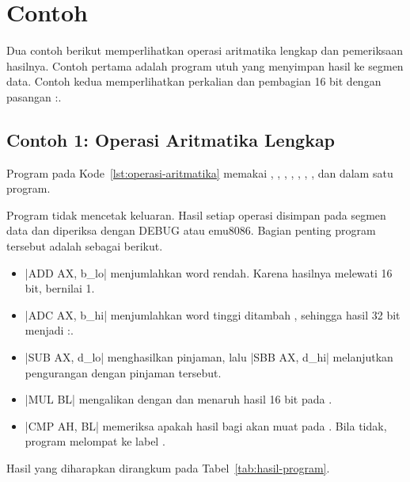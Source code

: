 \section{Contoh}
\label{sec:contoh-bab10}

Dua contoh berikut memperlihatkan operasi aritmatika lengkap dan
pemeriksaan hasilnya. Contoh pertama adalah program utuh yang
menyimpan hasil ke segmen data. Contoh kedua memperlihatkan
perkalian dan pembagian 16 bit dengan pasangan :.

\subsection{Contoh 1: Operasi Aritmatika Lengkap}

Program pada Kode~\ref{lst:operasi-aritmatika} memakai ,
, , , , , ,
dan  dalam satu program.



Program tidak mencetak keluaran. Hasil setiap operasi disimpan pada
segmen data dan diperiksa dengan DEBUG atau emu8086. Bagian penting
program tersebut adalah sebagai berikut.

\begin{itemize}
    \item \lstasm|ADD AX, b_lo| menjumlahkan word rendah. Karena
          hasilnya melewati 16 bit,  bernilai 1.
    \item \lstasm|ADC AX, b_hi| menjumlahkan word tinggi ditambah
          , sehingga hasil 32 bit menjadi
          :.
    \item \lstasm|SUB AX, d_lo| menghasilkan pinjaman, lalu
          \lstasm|SBB AX, d_hi| melanjutkan pengurangan dengan
          pinjaman tersebut.
    \item \lstasm|MUL BL| mengalikan  dengan  dan
          menaruh hasil 16 bit pada .
    \item \lstasm|CMP AH, BL| memeriksa apakah hasil bagi 
          akan muat pada . Bila tidak, program melompat ke
          label .
\end{itemize}

Hasil yang diharapkan dirangkum pada Tabel~\ref{tab:hasil-program}.

